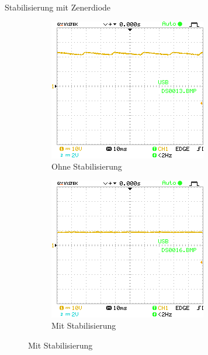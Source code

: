 \documentclass{article}
\theoremstyle{definition}
\begin{document}
\begin{aufgabe}{Stabilisierung mit Zenerdiode}
\begin{figure}[h!]
    \begin{subfigure}[b]{0.45\textwidth}
        \includegraphics[width=\textwidth]{MesswerteVersuch2/DS0013.png}
          \caption{Ohne Stabilisierung}
    \end{subfigure}
    \hfill
    \begin{subfigure}[b]{0.45\textwidth}
        \includegraphics[width=\textwidth]{MesswerteVersuch2/DS0016.png}
        \caption{Mit Stabilisierung}
    \end{subfigure}



\end{figure}
\end{aufgabe}
\end{document}
